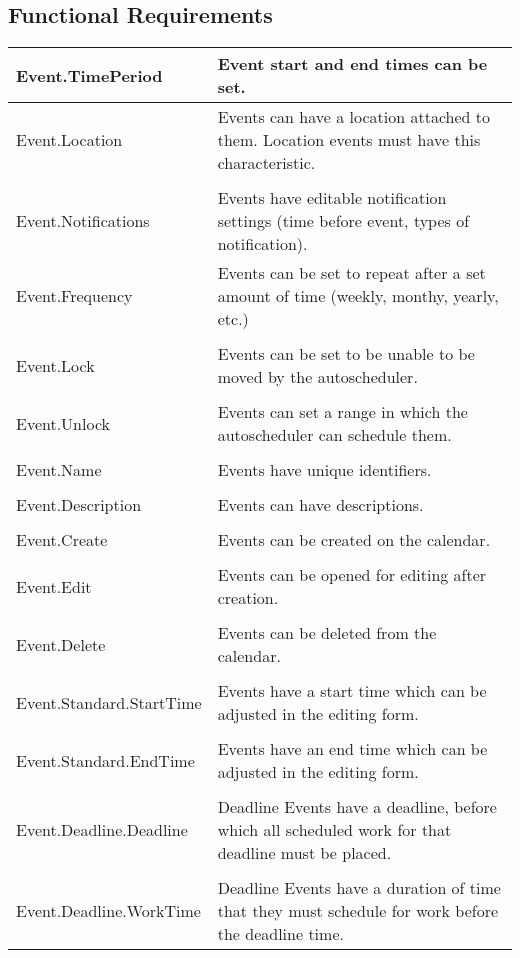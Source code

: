 \documentclass{scrreprt}
\begin{document}
\subsection{Functional Requirements}
\begin{center}
\begin{longtable}{ | p{6cm} | p{9cm} | }
\hline
Event.TimePeriod & Event start and end times can be set. \\
\hline
Event.Location & Events can have a location attached to them. Location events must have this characteristic. \\
& \\
Event.Notifications & Events have editable notification settings (time before event, types of notification).\\
\hline
Event.Frequency & Events can be set to repeat after a set amount of time (weekly, monthy, yearly, etc.) \\
& \\
Event.Lock & Events can be set to be unable to be moved by the autoscheduler. \\
& \\
Event.Unlock & Events can set a range in which the autoscheduler can schedule them.\\
& \\
Event.Name & Events have unique identifiers. \\
& \\
Event.Description & Events can have descriptions.\\
& \\
Event.Create & Events can be created on the calendar. \\
& \\
Event.Edit & Events can be opened for editing after creation. \\
& \\
Event.Delete & Events can be deleted from the calendar. \\
& \\
Event.Standard.StartTime & Events have a start time which can be adjusted in the editing form. \\
& \\
Event.Standard.EndTime & Events have an end time which can be adjusted in the editing form. \\
& \\
Event.Deadline.Deadline & Deadline Events have a deadline, before which all scheduled work for that deadline must be placed. \\
& \\
Event.Deadline.WorkTime & Deadline Events have a duration of time that they must schedule for work before the deadline time. \\

\hline
\end{longtable}
\end{center}
\end{document}
